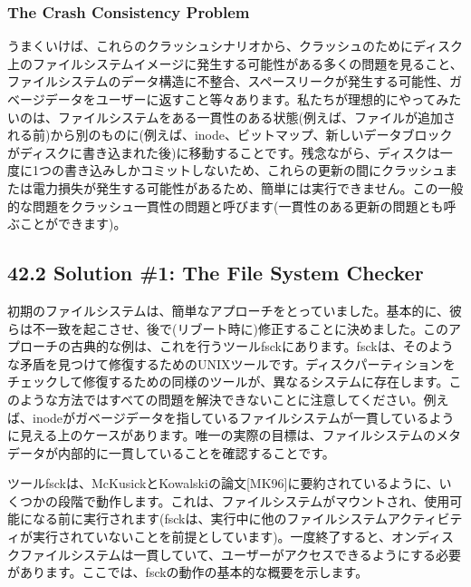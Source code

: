 \hypertarget{the-crash-consistency-problem}{%
\subsubsection*{The Crash Consistency
Problem}\label{the-crash-consistency-problem}}

うまくいけば、これらのクラッシュシナリオから、クラッシュのためにディスク上のファイルシステムイメージに発生する可能性がある多くの問題を見ること、ファイルシステムのデータ構造に不整合、スペースリークが発生する可能性、ガベージデータをユーザーに返すこと等々あります。私たちが理想的にやってみたいのは、ファイルシステムをある一貫性のある状態(例えば、ファイルが追加される前)から別のものに(例えば、inode、ビットマップ、新しいデータブロックがディスクに書き込まれた後)に移動することです。残念ながら、ディスクは一度に1つの書き込みしかコミットしないため、これらの更新の間にクラッシュまたは電力損失が発生する可能性があるため、簡単には実行できません。この一般的な問題をクラッシュ一貫性の問題と呼びます(一貫性のある更新の問題とも呼ぶことができます)。

\hypertarget{solution-1-the-file-system-checker}{%
\subsection*{42.2 Solution \#1: The File System
Checker}\label{solution-1-the-file-system-checker}}

初期のファイルシステムは、簡単なアプローチをとっていました。基本的に、彼らは不一致を起こさせ、後で(リブート時に)修正することに決めました。このアプローチの古典的な例は、これを行うツールfsckにあります。fsckは、そのような矛盾を見つけて修復するためのUNIXツールです。ディスクパーティションをチェックして修復するための同様のツールが、異なるシステムに存在します。このような方法ではすべての問題を解決できないことに注意してください。例えば、inodeがガベージデータを指しているファイルシステムが一貫しているように見える上のケースがあります。唯一の実際の目標は、ファイルシステムのメタデータが内部的に一貫していることを確認することです。

ツールfsckは、McKusickとKowalskiの論文{[}MK96{]}に要約されているように、いくつかの段階で動作します。これは、ファイルシステムがマウントされ、使用可能になる前に実行されます(fsckは、実行中に他のファイルシステムアクティビティが実行されていないことを前提としています)。一度終了すると、オンディスクファイルシステムは一貫していて、ユーザーがアクセスできるようにする必要があります。ここでは、fsckの動作の基本的な概要を示します。

